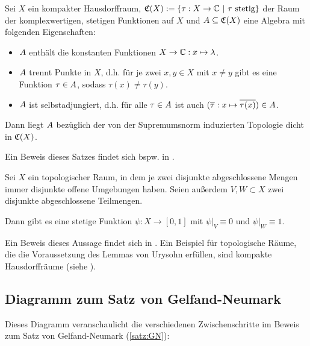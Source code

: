 \begin{satz}\label{satz:SW}
Sei $X$ ein kompakter Hausdorffraum, $\mathfrak{C}(X) :=\{\tau: X \to \mathbb{C} ~|~ \tau \text{ stetig}\}$ der Raum der komplexwertigen, stetigen Funktionen auf $X$ und $A \subseteq \mathfrak{C}(X)$ eine Algebra mit folgenden Eigenschaften:
\begin{itemize}
	\item $A$ enthält die konstanten Funktionen $X \to \mathbb{C}: x \mapsto \lambda$.
	\item $A$ trennt Punkte in $X$, d.h. für je zwei $x, y \in X$ mit $x \neq y$ gibt es eine Funktion $\tau \in A$, sodass $\tau(x) \neq \tau(y)$.
	\item $A$ ist selbstadjungiert, d.h. für alle $\tau \in A$ ist auch $(\overline{\tau}: x \mapsto \overline{\tau(x)}) \in A$.
\end{itemize}
Dann liegt $A$ bezüglich der von der Supremumsnorm induzierten Topologie dicht in $\mathfrak{C}(X)$.
\end{satz}

Ein Beweis dieses Satzes findet sich bspw. in \cite[Satz VIII.4.7]{Werner2011}.


\begin{satz}\label{satz:Ury}
Sei $X$ ein topologischer Raum, in dem je zwei disjunkte abgeschlossene Mengen immer disjunkte offene Umgebungen haben. Seien außerdem $V, W \subset X$ zwei disjunkte abgeschlossene Teilmengen. 

Dann gibt es eine stetige Funktion $\psi: X \to [0,1]$ mit $\psi|_V \equiv 0$ und $\psi|_W \equiv 1$.
\end{satz}

Ein Beweis dieses Aussage findet sich in \cite[S. 136-139]{Jaenich2008}. Ein Beispiel für topologische Räume, die die Voraussetzung des Lemmas von Urysohn erfüllen, sind kompakte Hausdorffräume (siehe \cite[S. 135 (Bemerkung)]{Jaenich2008}).





\newpage
\subsection{Diagramm zum Satz von Gelfand-Neumark}\label{sec:DiagramGN}
Dieses Diagramm veranschaulicht die verschiedenen Zwischenschritte im Beweis zum Satz von Gelfand-Neumark (\cref{satz:GN}):

\begin{sideways}
	\begin{minipage}{18cm}
		\fontsize{8pt}{1.5}\selectfont
		
	\end{minipage}
\end{sideways}